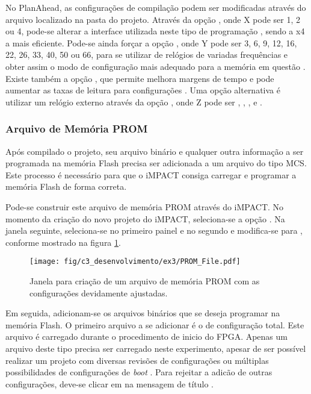 \documentclass[11pt,a4paper,oneside]{book}
\begin{document}
No PlanAhead, as configurações de compilação podem ser modificadas através do arquivo  localizado na pasta  do projeto.
Através da opção , onde X pode ser 1, 2 ou 4, pode-se alterar a interface utilizada neste tipo de programação \cite{ug628, xapp576}, sendo a x4 a mais eficiente.
Pode-se ainda forçar a opção , onde Y pode ser 3, 6, 9, 12, 16, 22, 26, 33, 40, 50 ou 66, para se utilizar de relógios de variadas frequências e obter assim o modo de configuração mais adequado para a memória em questão \cite{xapp586, ug628, ug810}.
Existe também a opção , que permite melhora margens de tempo e pode aumentar as taxas de leitura para configurações \cite{ug628, ug586}.
Uma opção alternativa é utilizar um relógio externo através da opção , onde Z pode ser , , ,  e .

\subsubsection{Arquivo de Memória PROM}
Após compilado o projeto, seu arquivo binário e qualquer outra informação a ser programada na memória Flash precisa ser adicionada a um arquivo do tipo MCS.
Este processo é necessário para que o iMPACT consiga carregar e programar a memória Flash de forma correta.

Pode-se construir este arquivo de memória PROM através do iMPACT.
No momento da criação do novo projeto do iMPACT, seleciona-se a opção .
Na janela seguinte, seleciona-se  no primeiro painel e  no segundo e modifica-se  para , conforme mostrado na figura \ref{fig:ex3:prom_file}.

\begin{figure}[htp]
\centering
\texttt{[image: fig/c3\_desenvolvimento/ex3/PROM\_File.pdf]}
\caption{Janela para criação de um arquivo de memória PROM com as configurações devidamente ajustadas.}
\label{fig:ex3:prom_file}
\end{figure}

Em seguida, adicionam-se os arquivos binários que se deseja programar na memória Flash.
O primeiro arquivo a se adicionar é o de configuração total.
Este arquivo é carregado durante o procedimento de inicio do FPGA.
Apenas um arquivo deste tipo precisa ser carregado neste experimento, apesar de ser possível realizar um projeto com diversas revisões de configurações ou múltiplas possibilidades de configurações de \textit{boot} \cite{xapp468, xapp1100}.
Para rejeitar a adicão de outras configurações, deve-se clicar em  na mensagem de título .
\end{document}
